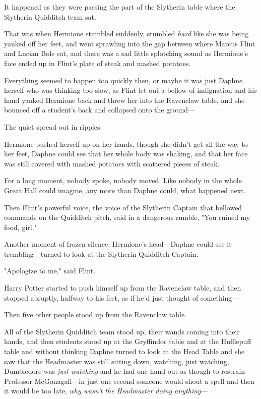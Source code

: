 It happened as they were passing the part of the Slytherin table where the
Slytherin Quidditch team sat.

That was when Hermione stumbled suddenly, stumbled \emph{hard} like she was
being yanked off her feet, and went sprawling into the gap between where Marcus
Flint and Lucian Bole sat, and there was a sad little splotching sound as
Hermione's face ended up in Flint's plate of steak and mashed potatoes.

Everything seemed to happen too quickly then, or maybe it was just Daphne
herself who was thinking too slow, as Flint let out a bellow of indignation and
his hand yanked Hermione back and threw her into the Ravenclaw table, and she
bounced off a student's back and collapsed onto the ground---

The quiet spread out in ripples.

Hermione pushed herself up on her hands, though she didn't get all the way to
her feet, Daphne could see that her whole body was shaking, and that her face
was still covered with mashed potatoes with scattered pieces of steak.

For a long moment, nobody spoke, nobody moved. Like nobody in the whole Great
Hall could imagine, any more than Daphne could, what happened next.

Then Flint's powerful voice, the voice of the Slytherin Captain that bellowed
commands on the Quidditch pitch, said in a dangerous rumble, "You ruined my
food, girl."

Another moment of frozen silence. Hermione's head---Daphne could see it
trembling---turned to look at the Slytherin Quidditch Captain.

"Apologize to me," said Flint.

Harry Potter started to push himself up from the Ravenclaw table, and then
stopped abruptly, halfway to his feet, as if he'd just thought of something---

Then five other people stood up from the Ravenclaw table.

All of the Slytherin Quidditch team stood up, their wands coming into their
hands, and then students stood up at the Gryffindor table and at the Hufflepuff
table and without thinking Daphne turned to look at the Head Table and she saw
that the Headmaster was still sitting down, watching, just watching, Dumbledore
was \emph{just watching} and he had one hand out as though to restrain
Professor McGonagall---in just one second someone would shout a spell and then
it would be too late, \emph{why wasn't the Headmaster doing anything}---

